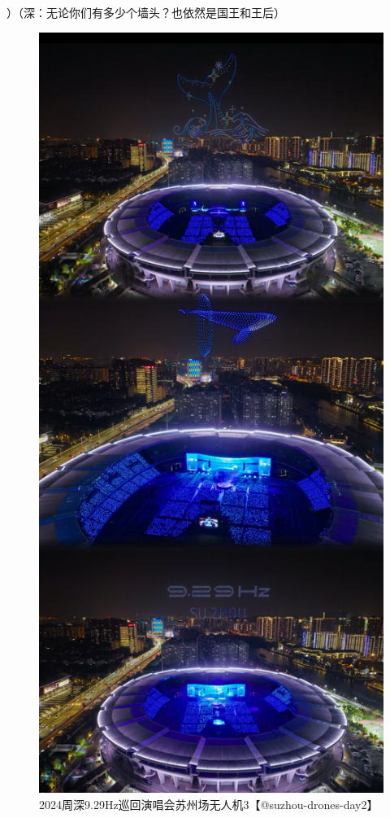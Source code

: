 \documentclass[]{ctexbook}
\begin{document}
）（深：无论你们有多少个墙头？也依然是国王和王后）

\begin{figure}

{\centering \includegraphics[width=400pt]{img/suzhou20241110/001} 

}

\caption{2024周深9.29Hz巡回演唱会苏州场无人机3【@suzhou-drones-day2】}\label{fig:unnamed-chunk-135}
\end{figure}
\end{document}

